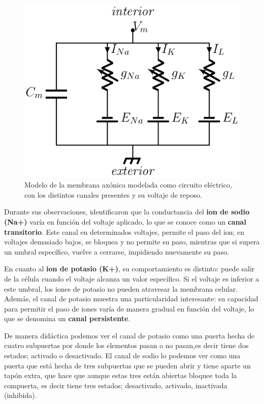 \begin{figure}[h]
 \centering
 \includegraphics[scale=0.5]{../Figuras/circuito.png}
 \caption{Modelo de la membrana axónica modelada como circuito eléctrico, con los distintos canales presentes y su voltaje de reposo.}
 \label{fig:circuito}
\end{figure}

Durante sus observaciones, identificaron que la conductancia del \textbf{ion de sodio (Na+)} varía en función del voltaje aplicado, lo que se conoce como un \textbf{canal transitorio}. Este canal en determinados voltajes, permite el paso del ion; en voltajes demasiado bajos, se bloquea y no permite su paso, mientras que si supera un umbral específico, vuelve a cerrarse, impidiendo nuevamente su paso.

En cuanto al \textbf{ion de potasio (K+)}, su comportamiento es distinto: puede salir de la célula cuando el voltaje alcanza un valor específico. Si el voltaje es inferior a este umbral, los iones de potasio no pueden atravesar la membrana celular. Además, el canal de potasio muestra una particularidad interesante: su capacidad para permitir el paso de iones varía de manera gradual en función del voltaje, lo que se denomina un \textbf{canal persistente}.

 De manera didáctica podemos ver el canal de potasio como una puerta hecha de cuatro subpuertas por donde los elementos pasan o no pasan,es decir tiene dos estados; activado o desactivado. El canal de sodio lo podemos ver como una puerta que está hecha de tres subpuertas que se pueden abrir y tiene aparte un tapón extra, que hace que aunque estas tres están abiertas bloquee toda la compuerta, es decir tiene tres estados; desactivado, activado, inactivada (inhibida).

